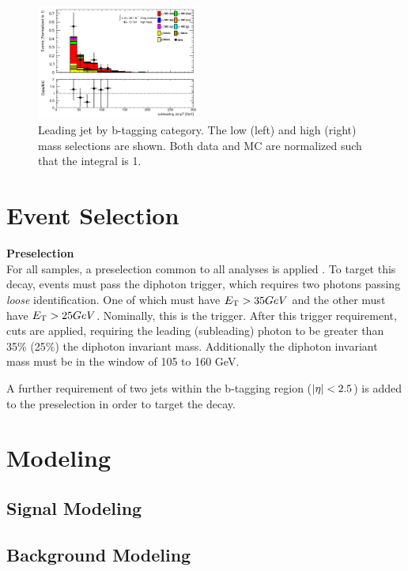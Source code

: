 \begin{figure}[htbp]
  \includegraphics[width=0.48\textwidth]{chapters/chapter5_yybb/images/data_MC_comparison/h_SR_h_2t_nominal_subleadingJet_pt.pdf}
  \caption[Subleading jet \pt.]{Leading jet \pt by b-tagging category. The low (left) and high (right) mass selections are shown. Both data and MC are normalized such that the integral is 1.
  \label{fig:jet_s_pt}}
\end{figure}



\section{Event Selection}
\noindent\textbf{Preselection}\\
\indent For all samples, a preselection common to all \Hgg analyses is applied \cite{hgam-preselection}. To target this decay, events must pass the diphoton trigger, which requires two photons passing \textit{loose} identification. One of which must have $\et > \unit{35}{GeV}$ and the other must have $\et > \unit{25}{GeV}$. Nominally, this is the  trigger. After this trigger requirement, \pt cuts are applied, requiring the leading (subleading) photon \pt to be greater than 35\% (25\%) the diphoton invariant mass. Additionally the diphoton invariant mass must be in the window of 105 to 160 GeV.

A further requirement of two jets within the b-tagging region ($|\eta| <2.5$) is added to the preselection in order to target the \Hbb decay.

\section{Modeling}
\subsection{Signal Modeling}
\subsection{Background Modeling}
